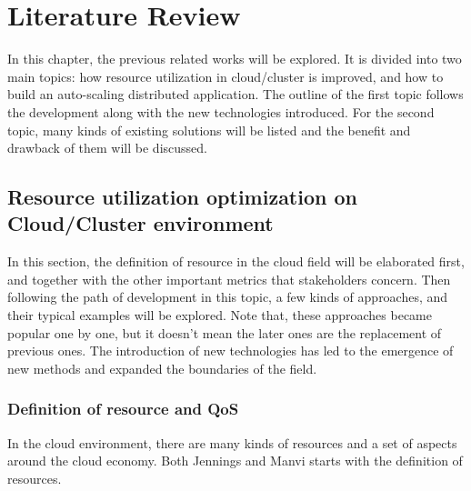 
\chapter{Literature Review} %



\ifpdf
    \graphicspath{{2_literaturereview/figures/PNG/}{2_literaturereview/figures/PDF/}{2_literaturereview/figures/}}
\else
    \graphicspath{{2_literaturereview/figures/EPS/}{2_literaturereview/figures/}}
\fi


% 
In this chapter, the previous related works will be explored. It is divided into two main topics: how resource utilization in cloud/cluster is improved, and how to build an auto-scaling distributed application. 
The outline of the first topic follows the development along with the new technologies introduced.
For the second topic, many kinds of existing solutions will be listed and the benefit and drawback of them will be discussed. 




\section{Resource utilization optimization on Cloud/Cluster environment}
In this section, the definition of resource in the cloud field will be elaborated first, and together with the other important metrics that stakeholders concern.
Then following the path of development in this topic, a few kinds of approaches, and their typical examples will be explored.
Note that, these approaches became popular one by one, but it doesn't mean the later ones are the replacement of previous ones.
The introduction of new technologies has led to the emergence of new methods and expanded the boundaries of the field.
\subsection{Definition of resource and QoS}
In the cloud environment, there are many kinds of resources and a set of aspects around the cloud economy.
Both Jennings \cite{Jennings2015} and Manvi \cite{Manvi2014} starts with the definition of resources.


